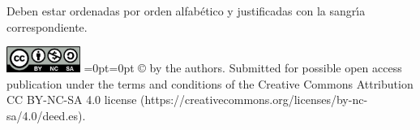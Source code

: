 \documentclass{article}
\begin{document}
Deben estar ordenadas por orden alfab\'{e}tico y justificadas con la sangr\'{\i}a correspondiente.



\vspace{1cm}
\vbox{\noindent
\includegraphics[width=0.18\textwidth]{logo-cc-by-nc-sa}}
=0pt=0pt
\hangindent=33mm\vspace{-4mm} 
\small
\copyright{}{\@ \the\year} by the authors. Submitted for possible open access publication under the terms and conditions of the Creative Commons Attribution CC BY-NC-SA 4.0 license (https://creativecommons.org/licenses/by-nc-sa/4.0/deed.es).
\end{document}
